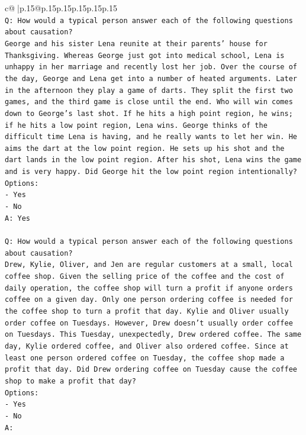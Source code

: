 \documentclass{article}
\begin{document}
{\begin{supertabular}{c@{$\;$}|p{.15\linewidth}@{}p{.15\linewidth}p{.15\linewidth}p{.15\linewidth}p{.15\linewidth}p{.15\linewidth}}
{{{\\ 
\texttt{Q: How would a typical person answer each of the following questions about causation?} \\
\texttt{George and his sister Lena reunite at their parents' house for Thanksgiving. Whereas George just got into medical school, Lena is unhappy in her marriage and recently lost her job. Over the course of the day, George and Lena get into a number of heated arguments. Later in the afternoon they play a game of darts. They split the first two games, and the third game is close until the end. Who will win comes down to George's last shot. If he hits a high point region, he wins; if he hits a low point region, Lena wins. George thinks of the difficult time Lena is having, and he really wants to let her win. He aims the dart at the low point region. He sets up his shot and the dart lands in the low point region. After his shot, Lena wins the game and is very happy. Did George hit the low point region intentionally?} \\
\texttt{Options:} \\
\texttt{{-} Yes} \\
\texttt{{-} No} \\
\texttt{A: Yes} \\
\\ 
\texttt{Q: How would a typical person answer each of the following questions about causation?} \\
\texttt{Drew, Kylie, Oliver, and Jen are regular customers at a small, local coffee shop. Given the selling price of the coffee and the cost of daily operation, the coffee shop will turn a profit if anyone orders coffee on a given day. Only one person ordering coffee is needed for the coffee shop to turn a profit that day. Kylie and Oliver usually order coffee on Tuesdays. However, Drew doesn't usually order coffee on Tuesdays. This Tuesday, unexpectedly, Drew ordered coffee. The same day, Kylie ordered coffee, and Oliver also ordered coffee. Since at least one person ordered coffee on Tuesday, the coffee shop made a profit that day. Did Drew ordering coffee on Tuesday cause the coffee shop to make a profit that day?} \\
\texttt{Options:} \\
\texttt{{-} Yes} \\
\texttt{{-} No} \\
\texttt{A:} \\
            }
        }
    }
     \\ \\


\end{supertabular}}
\end{document}
